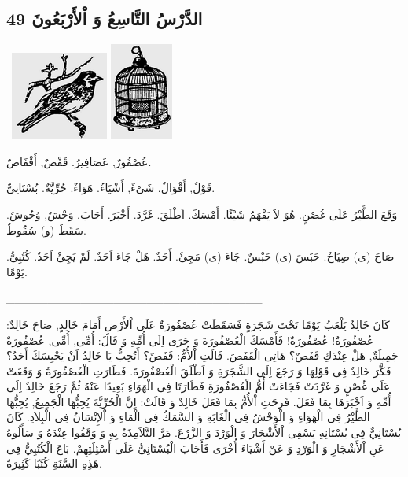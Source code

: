 \documentclass[a5paper]{article}
\begin{document}
\subsection[الدَّرْسُ التَّاسِعُ وَ اْلأَرْبَعُونَ 49]{الدَّرْسُ التَّاسِعُ وَ اْلأَرْبَعُونَ 49}
\  \includegraphics[width=1.2602in,height=1.1457in]{images/MuhammadBagauddinprettified-img161.png}   \includegraphics[width=0.8126in,height=1.2602in]{images/MuhammadBagauddinprettified-img162.png} 

عُصْفُورٌ, عَصَافِيرُ. قَفْصٌ, أَقْفَاصٌ. 

قَوْلٌ, أَقْوَالٌ. شَىْءٌ, أَشْيَاءُ. هَوَاءٌ. حُرِّيَّةٌ. بُسْتَانِىٌّ. 

وَقَعَ الطَّيْرُ عَلَى غُصْنٍ. هُوَ لاَ يَفْهَمُ شَيْئًا. أَمْسَكَ. اَطْلَقَ. غَرَّدَ. أَخْبَرَ. أَجَابَ. وَحْشٌ, وُحُوشٌ. سَقَطَ (و) سُقُوطٌ. 

صَاحَ (ى) صِيَاحٌ. حَبَسَ (ى) حَبْسٌ. جَاءَ (ى) مَجِئٌ. أَحَدٌ. هَلْ جَاءَ اَحَدٌ. لَمْ يَجِئْ اَحَدٌ. كُتُبِىٌّ. يَوْمًا.

\_\_\_\_\_\_\_\_\_\_\_\_\_\_\_\_\_\_\_\_\_\_\_\_\_\_\_\_\_\_\_

كَانَ خَالِدٌ يَلْعَبُ يَوْمًا تَحْتَ شَجَرَةٍ فَسَقَطَتْ عُصْفُورَةٌ عَلَى اْلأَرْضِ أَمَامَ خَالِدٍ, صَاحَ خَالِدٌ: عُصْفُورَةٌ! عُصْفُورَةٌ! فَأَمْسَكَ الْعُصْفُورَةَ وَ جَرَى اِلَى أُمِّهِ وَ قَالَ: أُمِّى, أُمِّى, عُصْفُورَةٌ جَمِيلَةٌ, هَلْ عِنْدَكِ قَفَصٌ؟ هَاتِى الْقَفَصَ. قَالَتِ اْلأُمُّ: قَفَصٌ؟ أَتُحِبُّ يَا خَالِدُ اَنْ يَحْبِسَكَ أَحَدٌ؟ فَكَّرَ خَالِدٌ فِى قَوْلِهَا وَ رَجَعَ اِلَى الشَّجَرَةِ وَ اَطْلَقَ الْعُصْفُورَةَ. فَطَارَتِ الْعُصْفُورَةُ وَ وَقَعَتْ عَلَى غُصْنٍ وَ غَرَّدَتْ فَجَاءَتْ أُمُّ الْعُصْفُورَةِ فَطَارَتَا فِى الْهَوَاءِ بَعِيدًا عَنْهُ ثُمَّ رَجَعَ خَالِدٌ اِلَى أُمِّهِ وَ اَخْبَرَهَا بِمَا فَعَلَ. فَرِحَتِ اْلأُمُّ بِمَا فَعَلَ خَالِدٌ وَ قَالَتْ: اِنَّ الْحُرِّيَّةَ يُحِبُّهَا الْجَمِيعُ, يُحِبُّهَا الطَّيْرُ فِى الْهَوَاءِ وَ الْوَحْشُ فِى الْغَابَةِ وَ السَّمَكُ فِى الْمَاءِ وَ اْلإِنْسَانُ فِى الْبِلاَدِ. كَانَ بُسْتَانِيٌّ فِى بُسْتَانِهِ يَسْقِى اْلأَشْجَارَ وَ الْوَرْدَ وَ الزَّرْعَ. مَرَّ التَّلاَمِذَةُ بِهِ وَ وَقَفُوا عِنْدَهُ وَ سَأَلُوهُ عَنِ اْلأَشْجَارِ وَ الْوَرْدِ وَ عَنْ أَشْيَاءَ أُخْرَى فَأَجَابَ الْبُسْتَانِىُّ عَلَى أَسْئِلَتِهِمْ. بَاعَ الْكُتُبِيُّ فِى هَذِهِ السَّنَةِ كُتُبًا كَثِيرَةً.
\end{document}
